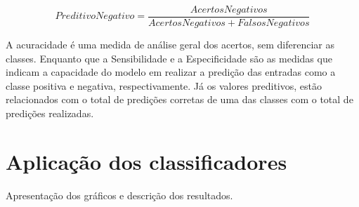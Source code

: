 \documentclass[oneside,openright,12pt]{ufsm_2015} %
\begin{document}
    \begin{equation} \label{eq:predit-neg}
    PreditivoNegativo = \frac{AcertosNegativos}{AcertosNegativos + FalsosNegativos}
    \end{equation}
    
    \par A acuracidade é uma medida de análise geral dos acertos, sem diferenciar as classes. Enquanto que a Sensibilidade e a Especificidade são as medidas que indicam a capacidade do modelo em realizar a predição das entradas como a classe positiva e negativa, respectivamente. Já os valores preditivos, estão relacionados com o total de predições corretas de uma das classes com o total de predições realizadas. 
    

\section{Aplicação dos classificadores}
\label{sec:exp-class}

    \par Apresentação dos gráficos e descrição dos resultados.
    
    \mydata
    
\end{document}
